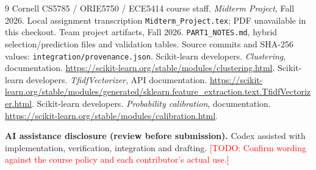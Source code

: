 \documentclass[10pt,twocolumn,letterpaper]{article}
\newcommand{\todo}[1]{\textcolor{red}{[TODO: #1]}}
\begin{document}
\begin{thebibliography}{9}
 Cornell CS5785 / ORIE5750 / ECE5414 course staff.
\emph{Midterm Project}, Fall 2026. Local assignment transcription
\texttt{Midterm\_Project.tex}; PDF unavailable in this checkout.
 Team project artifacts, Fall 2026.
\texttt{PART1\_NOTES.md}, hybrid selection/prediction files and validation tables.
Source commits and SHA-256 values: \texttt{integration/provenance.json}.
 Scikit-learn developers. \emph{Clustering}, documentation.
\url{https://scikit-learn.org/stable/modules/clustering.html}.
 Scikit-learn developers. \emph{TfidfVectorizer}, API documentation.
\url{https://scikit-learn.org/stable/modules/generated/sklearn.feature_extraction.text.TfidfVectorizer.html}.
 Scikit-learn developers. \emph{Probability calibration}, documentation.
\url{https://scikit-learn.org/stable/modules/calibration.html}.
\end{thebibliography}
\noindent\textbf{AI assistance disclosure (review before submission).}
Codex assisted with implementation, verification, integration and drafting.
\todo{Confirm wording against the course policy and each contributor's actual use.}
\end{document}
